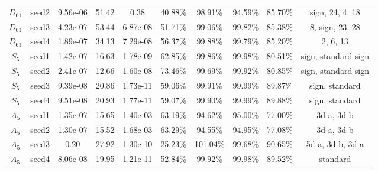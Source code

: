 \begin{tabular}{cccccccccc}
 $D_{61}$ & seed2 &  9.56e-06 &         51.42 &            0.38 &   40.88\% &   98.91\% &   94.59\% & 85.70\% &                 sign, 24, 4, 18 \\
 $D_{61}$ & seed3 &  4.23e-07 &         53.44 &        6.87e-08 &   51.71\% &   99.06\% &   99.82\% & 85.38\% &                 8, sign, 23, 28 \\
 $D_{61}$ & seed4 &  1.89e-07 &         34.13 &        7.29e-08 &   56.37\% &   99.88\% &   99.79\% & 85.20\% &                        2, 6, 13 \\
  $S_{5}$ & seed1 &  1.42e-07 &         16.63 &        1.78e-09 &   62.85\% &   99.86\% &   99.98\% & 80.51\% &             sign, standard-sign \\
  $S_{5}$ & seed2 &  2.41e-07 &         12.66 &        1.60e-08 &   73.46\% &   99.69\% &   99.92\% & 80.85\% &             sign, standard-sign \\
  $S_{5}$ & seed3 &  9.39e-08 &         20.86 &        1.73e-11 &   59.06\% &   99.91\% &   99.99\% & 89.87\% &                  sign, standard \\
  $S_{5}$ & seed4 &  9.51e-08 &         20.93 &        1.77e-11 &   59.07\% &   99.90\% &   99.99\% & 89.88\% &                  sign, standard \\
  $A_{5}$ & seed1 &  1.35e-07 &         15.65 &        1.40e-03 &   63.19\% &   94.62\% &   95.00\% & 77.00\% &                      3d-a, 3d-b \\
  $A_{5}$ & seed2 &  1.30e-07 &         15.52 &        1.68e-03 &   63.29\% &   94.55\% &   94.95\% & 77.08\% &                      3d-a, 3d-b \\
  $A_{5}$ & seed3 &      0.20 &         27.92 &        1.30e-10 &   25.23\% &  101.04\% &   99.68\% & 90.65\% &                5d-a, 3d-b, 3d-a \\
  $A_{5}$ & seed4 &  8.06e-08 &         19.95 &        1.21e-11 &   52.84\% &   99.92\% &   99.98\% & 89.52\% &                        standard \\
\bottomrule
\end{tabular}
